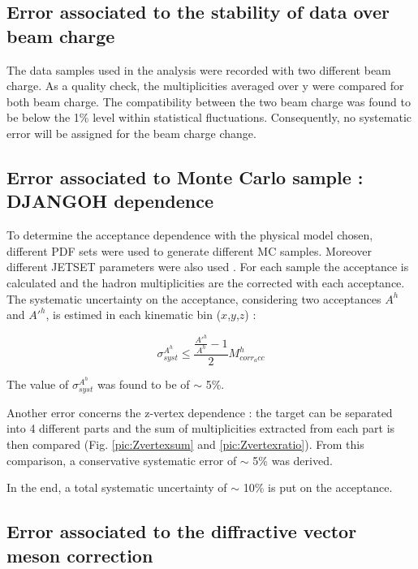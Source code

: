 
\subsection{Error associated to the stability of data over beam charge}

The data samples used in the analysis were recorded with two different beam charge. As a quality check, the multiplicities averaged over y were compared for both beam charge. The compatibility between the two beam charge was found to be below the 1\% level within statistical fluctuations. Consequently, no systematic error will be assigned for the beam charge change.


\subsection{Error associated to Monte Carlo sample : DJANGOH dependence}

To determine the acceptance dependence with the physical model chosen, different PDF sets were used to generate different MC samples. Moreover different JETSET parameters were also used \cite{}. For each sample the acceptance is calculated and the hadron multiplicities are the corrected with each acceptance. The systematic uncertainty on the acceptance, considering two acceptances $A^h$ and $A'^h$, is estimed in each kinematic bin ($x$,$y$,$z$) :

\begin{equation}
  \sigma^{A^h}_{syst} \leq \frac{\frac{A'^h}{A^h}-1}{2}M^h_{corr_acc}
\end{equation}

The value of $\sigma^{A^h}_{syst}$ was found to be of $\sim$ 5\%.

Another error concerns the z-vertex dependence : the target can be separated into 4 different parts and the sum of multiplicities extracted from each part is then compared (Fig. \ref{pic:Zvertexsum} and \ref{pic:Zvertexratio}). From this comparison, a conservative systematic error of $\sim$ 5\% was derived.

In the end, a total systematic uncertainty of $\sim$ 10\% is put on the acceptance.


\subsection{Error associated to the diffractive vector meson correction}

